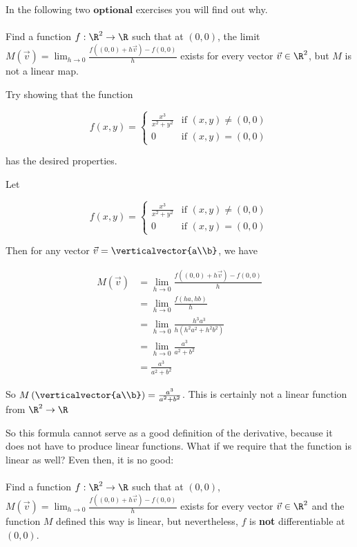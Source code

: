 \documentclass{ximera}
\begin{document}
	In the following two $\textbf{optional}$ exercises you will find out why.
	\\
	\\
	Find a function $f:\R^2\to \R$ such that at $(0,0)$, the limit $M(\vec{v}) = \displaystyle\lim_{h \to 0}\frac{f((0,0)+h\vec{v}) - f(0,0)}{h}$ exists for every vector $\vec{v} \in \R^2$, but 
	$M$ is not a linear map.
	
	\begin{hint}
		Try showing that the function 
		
		\[f(x,y) = \begin{cases} 
			\frac{x^3}{x^2+y^2} & \text{if $(x,y) \neq (0,0)$} \\
			0 & \text{if $(x,y) = (0,0)$}
			\end{cases}\] 
			
			has the desired properties.
	\end{hint}
	\begin{free-response}
		Let 
		
		\[f(x,y) = \begin{cases} 
			\frac{x^3}{x^2+y^2} & \text{if $(x,y) \neq (0,0)$} \\
			0 & \text{if $(x,y) = (0,0)$}
			\end{cases}\] 
			
		Then for any vector $\vec{v} = \verticalvector{a\\b}$, we have 
		
		\begin{align*}
			M\left(\vec{v}\right) &= \lim_{h \to 0}\frac{f((0,0)+h\vec{v}) - f(0,0)}{h}\\
							&= \lim_{h \to 0}\frac{f(ha,hb)}{h}\\
							&=\lim_{h \to 0}\frac{h^3a^3}{h(h^2a^2+h^2b^2)}\\
							&=\lim_{h \to 0}\frac{a^3}{a^2+b^2}\\
							&=\frac{a^3}{a^2+b^2}
		\end{align*}
		
		So $M\left(\verticalvector{a\\b}\right) = \frac{a^3}{a^2+b^2}$.  This is certainly not a linear function from $\R^2 \to \R$
			
	\end{free-response}
	
	So this formula cannot serve as a good definition of the derivative, because it does not have to produce linear functions.  What if we require that the function is linear as well?
	Even then, it is no good:
	\\
	\\
	Find a function $f:\R^2 \to \R$ such that at $(0,0)$, $M(\vec{v}) = \lim_{h \to 0}\frac{f((0,0)+h\vec{v}) - f(0,0)}{h}$ exists for every vector $\vec{v} \in \R^2$ and 
	the function $M$ defined this way is linear, but nevertheless, $f$ is \textbf{not} differentiable at $(0,0)$.
	
\end{document}
